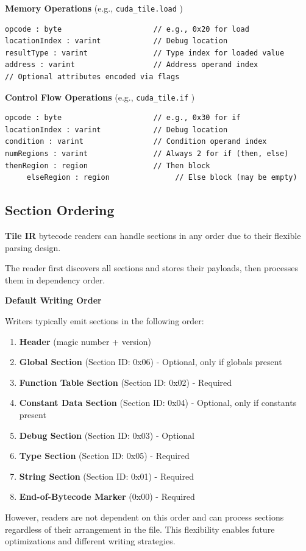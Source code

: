 \documentclass{article}
\begin{document}
\textbf{Memory Operations} (e.g., \texttt{cuda\_tile.load} )


\begin{lstlisting}
opcode : byte                     // e.g., 0x20 for load
locationIndex : varint            // Debug location
resultType : varint               // Type index for loaded value
address : varint                  // Address operand index
// Optional attributes encoded via flags
\end{lstlisting}

\textbf{Control Flow Operations} (e.g., \texttt{cuda\_tile.if} )


\begin{lstlisting}
opcode : byte                     // e.g., 0x30 for if
locationIndex : varint            // Debug location
condition : varint                // Condition operand index
numRegions : varint               // Always 2 for if (then, else)
thenRegion : region               // Then block
     elseRegion : region               // Else block (may be empty)
\end{lstlisting}


\subsection{Section Ordering}

\textbf{Tile IR} bytecode readers can handle sections in any order due to their flexible parsing design.

The reader first discovers all sections and stores their payloads, then processes them in dependency order.


\textbf{Default Writing Order}


Writers typically emit sections in the following order:


\begin{enumerate}
\item \textbf{Header} (magic number + version)
\item \textbf{Global Section} (Section ID: 0x06) - Optional, only if globals present
\item \textbf{Function Table Section} (Section ID: 0x02) - Required
\item \textbf{Constant Data Section} (Section ID: 0x04) - Optional, only if constants present
\item \textbf{Debug Section} (Section ID: 0x03) - Optional
\item \textbf{Type Section} (Section ID: 0x05) - Required
\item \textbf{String Section} (Section ID: 0x01) - Required
\item \textbf{End-of-Bytecode Marker} (0x00) - Required

\end{enumerate}
However, readers are not dependent on this order and can process sections regardless of their arrangement in the file. This flexibility enables future optimizations and different writing strategies.
\end{document}
